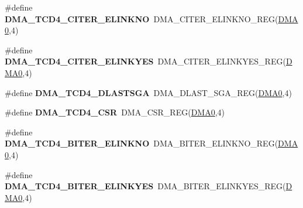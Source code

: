 \begin{DoxyCompactItemize}
\item 
\#define {\bfseries D\+M\+A\+\_\+\+T\+C\+D4\+\_\+\+C\+I\+T\+E\+R\+\_\+\+E\+L\+I\+N\+K\+NO}~D\+M\+A\+\_\+\+C\+I\+T\+E\+R\+\_\+\+E\+L\+I\+N\+K\+N\+O\+\_\+\+R\+EG(\hyperlink{group__DMA__Peripheral__Access__Layer_ga4103044f9ca209772f513dc694513ffb}{D\+M\+A0},4)\hypertarget{group__DMA__Register__Accessor__Macros_ga11418abcfba691b0c95b6996829e4398}{}\label{group__DMA__Register__Accessor__Macros_ga11418abcfba691b0c95b6996829e4398}

\item 
\#define {\bfseries D\+M\+A\+\_\+\+T\+C\+D4\+\_\+\+C\+I\+T\+E\+R\+\_\+\+E\+L\+I\+N\+K\+Y\+ES}~D\+M\+A\+\_\+\+C\+I\+T\+E\+R\+\_\+\+E\+L\+I\+N\+K\+Y\+E\+S\+\_\+\+R\+EG(\hyperlink{group__DMA__Peripheral__Access__Layer_ga4103044f9ca209772f513dc694513ffb}{D\+M\+A0},4)\hypertarget{group__DMA__Register__Accessor__Macros_ga5f9ae40aad0685169fe662966b2093e7}{}\label{group__DMA__Register__Accessor__Macros_ga5f9ae40aad0685169fe662966b2093e7}

\item 
\#define {\bfseries D\+M\+A\+\_\+\+T\+C\+D4\+\_\+\+D\+L\+A\+S\+T\+S\+GA}~D\+M\+A\+\_\+\+D\+L\+A\+S\+T\+\_\+\+S\+G\+A\+\_\+\+R\+EG(\hyperlink{group__DMA__Peripheral__Access__Layer_ga4103044f9ca209772f513dc694513ffb}{D\+M\+A0},4)\hypertarget{group__DMA__Register__Accessor__Macros_ga087e361e7331f84abef82e41a3c6961f}{}\label{group__DMA__Register__Accessor__Macros_ga087e361e7331f84abef82e41a3c6961f}

\item 
\#define {\bfseries D\+M\+A\+\_\+\+T\+C\+D4\+\_\+\+C\+SR}~D\+M\+A\+\_\+\+C\+S\+R\+\_\+\+R\+EG(\hyperlink{group__DMA__Peripheral__Access__Layer_ga4103044f9ca209772f513dc694513ffb}{D\+M\+A0},4)\hypertarget{group__DMA__Register__Accessor__Macros_ga2a4c75adfdd4fccd9a457a92aab5ebb3}{}\label{group__DMA__Register__Accessor__Macros_ga2a4c75adfdd4fccd9a457a92aab5ebb3}

\item 
\#define {\bfseries D\+M\+A\+\_\+\+T\+C\+D4\+\_\+\+B\+I\+T\+E\+R\+\_\+\+E\+L\+I\+N\+K\+NO}~D\+M\+A\+\_\+\+B\+I\+T\+E\+R\+\_\+\+E\+L\+I\+N\+K\+N\+O\+\_\+\+R\+EG(\hyperlink{group__DMA__Peripheral__Access__Layer_ga4103044f9ca209772f513dc694513ffb}{D\+M\+A0},4)\hypertarget{group__DMA__Register__Accessor__Macros_ga026a693d34bf8ae3c371c5f4ce25e073}{}\label{group__DMA__Register__Accessor__Macros_ga026a693d34bf8ae3c371c5f4ce25e073}

\item 
\#define {\bfseries D\+M\+A\+\_\+\+T\+C\+D4\+\_\+\+B\+I\+T\+E\+R\+\_\+\+E\+L\+I\+N\+K\+Y\+ES}~D\+M\+A\+\_\+\+B\+I\+T\+E\+R\+\_\+\+E\+L\+I\+N\+K\+Y\+E\+S\+\_\+\+R\+EG(\hyperlink{group__DMA__Peripheral__Access__Layer_ga4103044f9ca209772f513dc694513ffb}{D\+M\+A0},4)\hypertarget{group__DMA__Register__Accessor__Macros_gac0e84c3dc53946dfd4bcd461b1620963}{}\label{group__DMA__Register__Accessor__Macros_gac0e84c3dc53946dfd4bcd461b1620963}


\end{DoxyCompactItemize}
